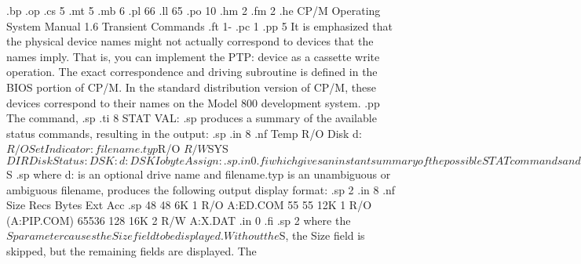 .bp
.op
.cs 5
.mt 5
.mb 6
.pl 66
.ll 65
.po 10
.hm 2
.fm 2
.he CP/M Operating System Manual              1.6  Transient Commands
.ft                                1-%
.pc 1
.pp 5
It is emphasized that the physical device names might not actually
correspond to devices that the names imply.  That is, you can 
implement the PTP: device as a cassette write operation.  The exact
correspondence and driving subroutine is defined in the BIOS portion of
CP/M.  In the standard distribution version of CP/M, these devices correspond
to their names on the Model 800 development system.
.pp
The command,
.sp
.ti 8
STAT VAL:
.sp
produces a summary of the available status commands, resulting in 
the output:
.sp
.in 8
.nf
Temp R/O Disk d:$R/O
Set Indicator: filename.typ $R/O $R/W $SYS $DIR
Disk Status: DSK: d:DSK
Iobyte Assign:
.sp
.in 0
.fi
which gives an instant summary of the possible STAT commands and shows the
permissible logical-to-physical device assignments:
.sp
.in 8
.nf
CON: = TTY: CRT: BAT: UC1:
RDR: = TTY: PTR: UR1: UR2:
PUN: = TTY: PTP: UP1: UP2:
LST: = TTY: CRT: LPT: UL1:
.fi
.in 0
.sp
The logical device to the left takes any of the four physical assignments
shown to the right.  The current logical-to-physical mapping is displayed by
typing the command:
.sp
.ti 8
STAT DEV:
.sp
This command produces a list of each logical device to the left and
the current
corresponding physical device to the right.  For example, the list might
appear as follows:
.sp
.in 8
.nf
CON: = CRT:
RDR: = UR1:
PUN: = PTP:
LST: = TTY:
.fi
.in 0
.sp
The current logical-to-physical device assignment is changed by typing a STAT
command of the form:
.sp
.ti 8
STAT ld1 = pd1, ld2 = pd2, ... , ldn = pdn
.sp
where ld1 through ldn are logical device names and pd1 through pdn are
compatible physical device names.  For example, ldi and pdi appear on the
same line
in the VAL: command shown above.  The following example shows valid STAT
commands that change the
current logical-to-physical device assignments:
.sp
.in 8
.nf
STAT CON:=CRT:
STAT PUN:=TTY:, LST:=LPT:, RDR:=TTY:
.in 0
.fi
.pp
The command form,
.sp
.ti 8
STAT d:filename.typ $S
.sp
where d: is an optional drive name and filename.typ is an unambiguous or
ambiguous filename, produces the following output display format:
.sp 2
.in 8
.nf
Size        Recs      Bytes          Ext Acc
.sp
   48        48         6K       1 R/O A:ED.COM
   55        55        12K       1 R/O (A:PIP.COM)
65536       128        16K       2 R/W A:X.DAT
.in 0
.fi
.sp 2
where the $S parameter causes the Size field to be displayed.  Without the
$S, the Size field is skipped, but the remaining fields are displayed.  The
